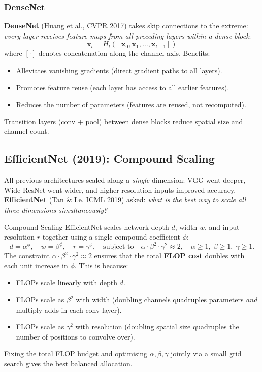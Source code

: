\documentclass[11pt,a4paper]{article}
\newcommand{\term}[1]{\textcolor{DefGreen}{\textbf{#1}}\index{#1}}
\begin{document}
\subsubsection{DenseNet}

\term{DenseNet} (Huang et al., CVPR 2017) takes skip connections to the extreme: \emph{every layer receives feature maps from all preceding layers within a dense block}:
\[
\mathbf{x}_l = H_l([\mathbf{x}_0, \mathbf{x}_1, \ldots, \mathbf{x}_{l-1}])
\]
where $[\cdot]$ denotes concatenation along the channel axis. Benefits:
\begin{itemize}
  \item Alleviates vanishing gradients (direct gradient paths to all layers).
  \item Promotes feature reuse (each layer has access to all earlier features).
  \item Reduces the number of parameters (features are reused, not recomputed).
\end{itemize}
Transition layers (conv + pool) between dense blocks reduce spatial size and channel count.

\subsection{EfficientNet (2019): Compound Scaling}
\label{sec:efficientnet}

All previous architectures scaled along a \emph{single} dimension: VGG went deeper, Wide ResNet
went wider, and higher-resolution inputs improved accuracy.  \term{EfficientNet} (Tan \& Le, ICML
2019) asked: \emph{what is the best way to scale all three dimensions simultaneously?}

\begin{defbox}{Compound Scaling}
EfficientNet scales network depth $d$, width $w$, and input resolution $r$ together using a
single compound coefficient $\phi$:
\[
  d = \alpha^\phi, \quad w = \beta^\phi, \quad r = \gamma^\phi,
  \quad \text{subject to} \quad \alpha \cdot \beta^2 \cdot \gamma^2 \approx 2,
  \quad \alpha \geq 1,\; \beta \geq 1,\; \gamma \geq 1.
\]
The constraint $\alpha \cdot \beta^2 \cdot \gamma^2 \approx 2$ ensures that the total
\textbf{FLOP cost} doubles with each unit increase in $\phi$.  This is because:
\begin{itemize}
  \item FLOPs scale linearly with depth $d$.
  \item FLOPs scale as $\beta^2$ with width (doubling channels quadruples parameters \emph{and}
    multiply-adds in each conv layer).
  \item FLOPs scale as $\gamma^2$ with resolution (doubling spatial size quadruples the number
    of positions to convolve over).
\end{itemize}
Fixing the total FLOP budget and optimising $\alpha,\beta,\gamma$ jointly via a small grid
search gives the best balanced allocation.
\end{defbox}
\end{document}
